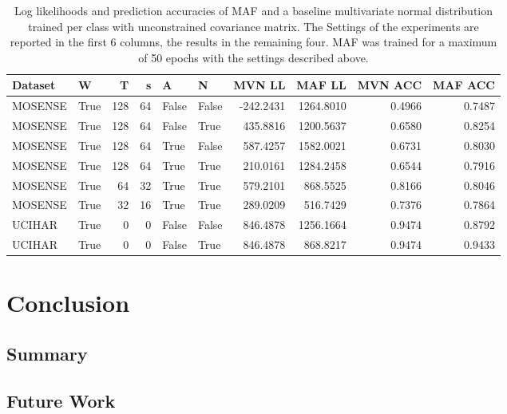 \documentclass[11pt,titlepage,oneside,openany]{book}
\begin{document}
\begin{table}
	\tiny
	\begin{tabularx}{\textwidth}{llrrllrrrr}
		\toprule
		Dataset &  W &  T &  s &  A &  N &    MVN LL &    MAF LL &  MVN ACC &  MAF ACC \\
		\midrule
		MOSENSE &    True &     128 &      64 &    False &  False & -242.2431 & 1264.8010 &   0.4966 &   0.7487 \\
		MOSENSE &    True &     128 &      64 &    False &   True &  435.8816 & 1200.5637 &   0.6580 &   0.8254 \\
		MOSENSE &    True &     128 &      64 &     True &  False &  587.4257 & 1582.0021 &   0.6731 &   0.8030 \\
		MOSENSE &    True &     128 &      64 &     True &   True &  210.0161 & 1284.2458 &   0.6544 &   0.7916 \\
		MOSENSE &    True &      64 &      32 &     True &   True &  579.2101 &  868.5525 &   0.8166 &   0.8046 \\
		MOSENSE &    True &      32 &      16 &     True &   True &  289.0209 &  516.7429 &   0.7376 &   0.7864 \\
		UCIHAR &    True &       0 &       0 &    False &  False &  846.4878 & 1256.1664 &   0.9474 &   0.8792 \\
		UCIHAR &    True &       0 &       0 &    False &   True &  846.4878 &  868.8217 &   0.9474 &   0.9433 \\
		\bottomrule
	\end{tabularx}
	\caption[Evaluation Results Motion Sense]{\label{tab:eps50} Log likelihoods and prediction accuracies of MAF and a baseline multivariate normal distribution trained per class with unconstrained covariance matrix. The Settings of the experiments are reported in the first 6 columns, the results in the remaining four. MAF was trained for a maximum of 50 epochs with the settings described above.}
\end{table}




\chapter{Conclusion}
\label{cha:conclusion}


\section{Summary}
\label{sec:sum}


\section{Future Work}
\label{sec:future}
\end{document}
